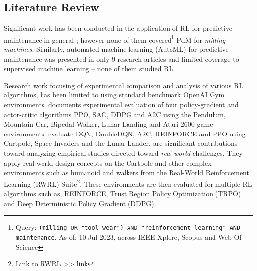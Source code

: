 \documentclass[a4paper, 12pt]{article}
\begin{document}
\subsection{Literature Review}
Significant work has been conducted in the application of RL for predictive maintenance in general \citep{Panzer2021, Erhan2021, siraskar2023}; however none of them covered\footnote{Query: \texttt{(milling OR "tool wear") AND "reinforcement learning" AND maintenance}. As of: 10-Jul-2023, across IEEE Xplore\texttrademark{}, Scopus\texttrademark{} and Web Of Science\texttrademark{}} PdM for \textit{milling machines}. %
Similarly, automated machine learning (AutoML) for predictive maintenance was presented in only 9 research articles and limited coverage to supervised machine learning -- none of them studied RL. %


Research work focusing of experimental comparison and analysis of various RL algorithms, has been limited to using standard benchmark OpenAI Gym environments. \cite{sandeep2022experimental} documents experimental evaluation of four policy-gradient and actor-critic algorithms PPO, SAC, DDPG and A2C using the Pendulum, Mountain Car, Bipedal Walker, Lunar Landing and Atari 2600 game environments. \cite{Krishna2020} evaluate DQN, DoubleDQN, A2C, REINFORCE and PPO using Cartpole, Space Invaders and the Lunar Lander. \cite{dulac2021, dulac2020empirical} are significant contributions toward analyzing empirical studies directed toward \textit{real-world} challenges. They apply real-world design concepts on the Cartpole and other complex environments such as humanoid and walkers from the Real-World Reinforcement Learning (RWRL) Suite\footnote{Link to RWRL >>   \href{https://github.com/google-research/realworldrl_suite}{link}}. These environments are then evaluated for multiple RL algorithms such as, REINFORCE, Trust Region Policy Optimization (TRPO) and Deep Deterministic Policy Gradient (DDPG). 
\end{document}
